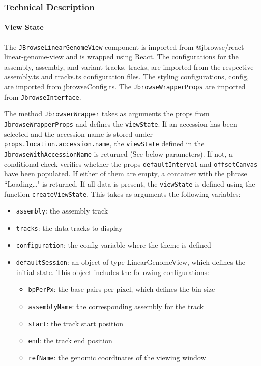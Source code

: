 \documentclass[12pt]{article}
\begin{document}
\subsubsection{Technical Description}

\paragraph{View State} 
The \verb +JBrowseLinearGenomeView+ component is imported from @jbrowse/react-linear-genome-view and is wrapped using React. The configurations for the assembly, assembly, and variant tracks, tracks, are imported from the respective assembly.ts and tracks.ts configuration files. The styling configurations, config, are imported from jbrowseConfig.ts. The \verb +JbrowseWrapperProps+ are imported from \verb +JbrowseInterface+. 

The method \verb +JbrowserWrapper+ takes as arguments the props from \verb +JbrowseWrapperProps+ and defines the \verb +viewState+. If an accession has been selected and the accession name is stored under \verb +props.location.accession.name+, the \verb +viewState+ defined in the \verb +JbrowseWithAccessionName+ is returned (See below parameters). If not, a conditional check verifies whether the props \verb +defaultInterval+ and \verb +offsetCanvas+ have been populated. If either of them are empty, a container with the phrase ``Loading…" is returned. If all data is present, the \verb +viewState+ is defined using the function \verb +createViewState+. This takes as arguments the following variables: 
\begin{itemize}
\item \verb +assembly+: the assembly track 
\item \verb +tracks+: the data tracks to display 
\item \verb +configuration+: the config variable where the theme is defined 
\item \verb +defaultSession+: an object of type LinearGenomeView, which defines the initial state. This object includes the following configurations: 
\begin{itemize}
\item \verb +bpPerPx+: the base pairs per pixel, which defines the bin size 
\item \verb +assemblyName+: the corresponding assembly for the track 
\item \verb +start+: the track start position 
\item \verb +end+: the track end position 
\item \verb +refName+: the genomic coordinates of the viewing window 
\end{itemize}
\end{itemize}
\end{document}
